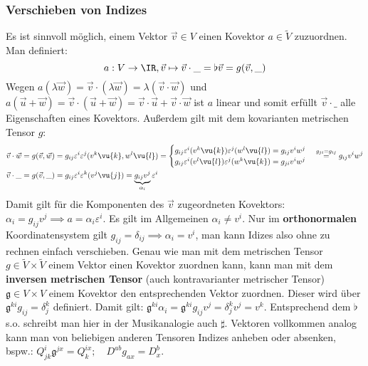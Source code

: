 	\subsubsection{Verschieben von Indizes}
	 Es ist sinnvoll möglich, einem Vektor $\vec{v}\in V$ einen Kovektor $a\in\tilde{V}$ zuzuordnen. Man definiert:
	\begin{equation}
		a: V \to \IR, \vec{v} \mapsto \vec{v}\cdot \_ =\flat\vec{v}=g(\vec{v},\_ )
	\end{equation}
	Wegen $a(\lambda\vec{w})=\vec{v}\cdot(\lambda\vec{w})=\lambda (\vec{v}\cdot\vec{w})$ und $a(\vec{u}+\vec{w})=\vec{v}\cdot(\vec{u}+\vec{w})=\vec{v}\cdot\vec{u}+\vec{v}\cdot\vec{w}$ ist $a$ linear und somit erfüllt $\vec{v}\cdot \_$ alle Eigenschaften eines Kovektors. Außerdem gilt mit dem kovarianten metrischen Tensor $g$:
	\begin{equation}\begin{split}
			\vec{v}\cdot\vec{w}&=g(\vec{v},\vec{w})=g_{ij} \varepsilon^i\varepsilon^j(v^k\vu{k},w^l\vu{l})=\begin{cases}g_{ij} \varepsilon^i(v^k\vu{k})\varepsilon^j(w^l\vu{l})=g_{ij}v^i w^j \\ g_{ij} \varepsilon^i(v^l\vu{l})\varepsilon^j(w^k\vu{k})=g_{ji}v^i w^j\end{cases} \stackrel{g_{ji}=g_{ij}}{=}g_{ij}v^i w^j\\
			\vec{v}\cdot\_ &= g(\vec{v},\_)=g_{ij}\varepsilon^i\varepsilon^k(v^j\vu{j})=\underbrace{g_{ij}v^j}_{\alpha_i}\varepsilon^i 
			\end{split}\end{equation}
		Damit gilt für die Komponenten des $\vec{v}$ zugeordneten Kovektors: $\alpha_i=g_{ij}v^j\implies a=\alpha_i\varepsilon^i$. Es gilt im Allgemeinen $\alpha_i\neq v^i$. Nur im \textbf{orthonormalen} Koordinatensystem gilt $g_{ij}=\delta_{ij}\implies\alpha_i = v^i$, man kann Idizes also ohne zu rechnen einfach verschieben. Genau wie man mit dem metrischen Tensor $g\in\tilde{V}\times\tilde{V}$ einem Vektor einen Kovektor zuordnen kann, kann man mit dem \textbf{inversen metrischen Tensor} (auch kontravarianter metrischer Tensor) $\mathfrak{g}\in V\times V$ einem Kovektor den entsprechenden Vektor zuordnen. Dieser wird über $\mathfrak{g}^{ki}g_{ij}=\delta^k_j$ definiert. Damit gilt: $\mathfrak{g}^{ki}\alpha_i=\mathfrak{g}^{ki}g_{ij} v^j= \delta^k_j v^j= v^k$. Entsprechend dem $\flat$ s.o. schreibt man hier in der Musikanalogie  auch $\sharp$. Vektoren vollkommen analog kann man von beliebigen anderen Tensoren Indizes anheben oder absenken, bspw.: $Q^i_{jk}\mathfrak{g}^{jx}=Q^{ix}_k;\quad D^{ab}g_{ax}=D_x^b$. 

